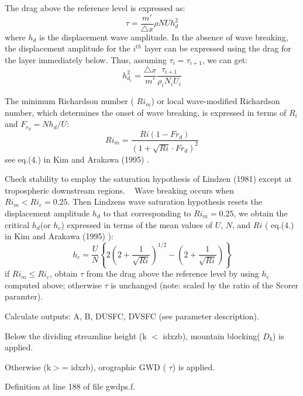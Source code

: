 \begin{DoxyItemize}
\begin{DoxyItemize}
\item The drag above the reference level is expressed as\+: \[ \tau=\frac{m'}{\triangle x}\rho NUh_d^2 \] where $h_{d}$ is the displacement wave amplitude. In the absence of wave breaking, the displacement amplitude for the $i^{th}$ layer can be expressed using the drag for the layer immediately below. Thus, assuming $\tau_i=\tau_{i+1}$, we can get\+: \[ h_{d_i}^2=\frac{\triangle x}{m'}\frac{\tau_{i+1}}{\rho_{i}N_{i}U_{i}} \]
\end{DoxyItemize}
\item The minimum Richardson number ( $Ri_{m}$) or local wave-\/modified Richardson number, which determines the onset of wave breaking, is expressed in terms of $R_{i}$ and $F_{r_{d}}=Nh_{d}/U$\+: \[ Ri_{m}=\frac{Ri(1-Fr_{d})}{(1+\sqrt{Ri}\cdot Fr_{d})^{2}} \] see eq.(4.) in Kim and Arakawa (1995) \cite{kim_and_arakawa_1995}.
\begin{DoxyItemize}
\item Check stability to employ the \textquotesingle{}saturation hypothesis\textquotesingle{} of Lindzen (1981) \cite{lindzen_1981} except at tropospheric downstream regions. ~\newline
 Wave breaking occurs when $Ri_{m}<Ri_{c}=0.25$. Then Lindzen\textquotesingle{}s wave saturation hypothesis resets the displacement amplitude $h_{d}$ to that corresponding to $Ri_{m}=0.25$, we obtain the critical $h_{d}$(or $h_{c}$) expressed in terms of the mean values of $U$, $N$, and $Ri$ ( eq.(4.) in Kim and Arakawa (1995) \cite{kim_and_arakawa_1995})\+: \[ h_{c}=\frac{U}{N}\left\{2(2+\frac{1}{\sqrt{Ri}})^{1/2}-(2+\frac{1}{\sqrt{Ri}})\right\} \] if $Ri_{m}\leq Ri_{c}$, obtain $\tau$ from the drag above the reference level by using $h_{c}$ computed above; otherwise $\tau$ is unchanged (note\+: scaled by the ratio of the Scorer paramter).
\end{DoxyItemize}
\item Calculate outputs\+: A, B, D\+U\+S\+FC, D\+V\+S\+FC (see parameter description).
\begin{DoxyItemize}
\item Below the dividing streamline height (k $<$ idxzb), mountain blocking( $D_{b}$) is applied.
\item Otherwise (k$>$= idxzb), orographic G\+WD ( $\tau$) is applied. 
\end{DoxyItemize}
\end{DoxyItemize}

Definition at line 188 of file gwdps.\+f.

